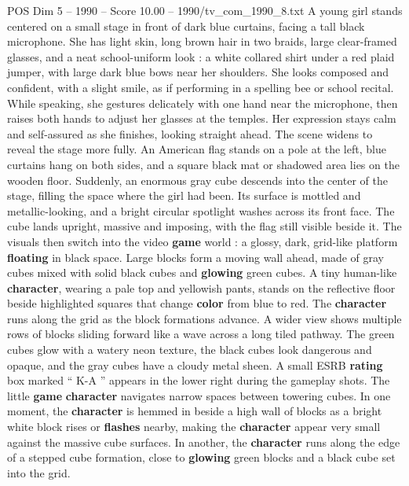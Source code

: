 \begin{textsample}{POS Dim 5 – 1990 – Score 10.00 – 1990/tv\_com\_1990\_8.txt}  \label{ex:f5_pos_011}
A young girl stands centered on a small stage in front of dark blue curtains, facing a tall black microphone.
She has light skin, long brown hair in two braids, large clear-framed glasses, and a neat school-uniform look : a white collared shirt under a red plaid jumper, with large dark blue bows near her shoulders.
She looks composed and confident, with a slight smile, as if performing in a spelling bee or school recital.
While speaking, she gestures delicately with one hand near the microphone, then raises both hands to adjust her glasses at the temples.
Her expression stays calm and self-assured as she finishes, looking straight ahead.
The scene widens to reveal the stage more fully.
An American flag stands on a pole at the left, blue curtains hang on both sides, and a square black mat or shadowed area lies on the wooden floor.
Suddenly, an enormous gray cube descends into the center of the stage, filling the space where the girl had been.
Its surface is mottled and metallic-looking, and a bright circular spotlight washes across its front face.
The cube lands upright, massive and imposing, with the flag still visible beside it.
The visuals then switch into the video \textbf{game} world : a glossy, dark, grid-like platform \textbf{floating} in black space.
Large blocks form a moving wall ahead, made of gray cubes mixed with solid black cubes and \textbf{glowing} green cubes.
A tiny human-like \textbf{character}, wearing a pale top and yellowish pants, stands on the reflective floor beside highlighted squares that change \textbf{color} from blue to red.
The \textbf{character} runs along the grid as the block formations advance.
A wider view shows multiple rows of blocks sliding forward like a wave across a long tiled pathway.
The green cubes glow with a watery neon texture, the black cubes look dangerous and opaque, and the gray cubes have a cloudy metal sheen.
A small ESRB \textbf{rating} box marked “ K-A ” appears in the lower right during the gameplay shots.
The little \textbf{game} \textbf{character} navigates narrow spaces between towering cubes.
In one moment, the \textbf{character} is hemmed in beside a high wall of blocks as a bright white block rises or \textbf{flashes} nearby, making the \textbf{character} appear very small against the massive cube surfaces.
In another, the \textbf{character} runs along the edge of a stepped cube formation, close to \textbf{glowing} green blocks and a black cube set into the grid.

\end{textsample}
